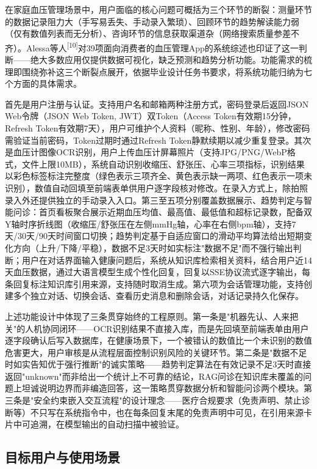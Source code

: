 \documentclass[zihao=-4,a4paper]{ctexart}
\begin{document}
在家庭血压管理场景中，用户面临的核心问题可概括为三个环节的断裂：测量环节的数据记录阻力大（手写易丢失、手动录入繁琐）、回顾环节的趋势解读能力弱（仅有数值列表而无分析）、咨询环节的信息获取渠道杂（网络搜索质量参差不齐）。Alessa等人\textsuperscript{[10]}对39项面向消费者的血压管理App的系统综述也印证了这一判断——绝大多数应用仅提供数据可视化，缺乏预测和趋势分析功能。功能需求的梳理即围绕弥补这三个断裂点展开，依据毕业设计任务书要求，将系统功能归纳为七个方面的具体需求。

首先是用户注册与认证。支持用户名和邮箱两种注册方式，密码登录后返回JSON Web令牌（JSON Web Token, JWT）双Token（Access Token有效期15分钟，Refresh Token有效期7天），用户可维护个人资料（昵称、性别、年龄），修改密码需验证当前密码，Token过期时通过Refresh Token静默续期以减少重复登录。其次是血压计图像OCR识别，用户上传血压计屏幕照片（支持JPG/PNG/WebP格式，文件上限10MB），系统自动识别收缩压、舒张压、心率三项指标，识别结果以彩色标签标注完整度（绿色表示三项齐全、黄色表示缺一两项、红色表示一项未识别），数值自动回填至前端表单供用户逐字段核对修改。在录入方式上，除拍照录入外还提供独立的手动录入入口。第三至五项分别覆盖数据展示、趋势判定与智能问诊：首页看板聚合展示近期血压均值、最高值、最低值和超标记录数，配备双Y轴时序折线图（收缩压/舒张压在左侧mmHg轴，心率在右侧bpm轴），支持7天/30天/90天时间窗口切换；趋势判定基于自适应窗口的滑动平均算法给出短期变化方向（上升/下降/平稳），数据不足3天时如实标注"数据不足"而不强行输出判断；用户在对话界面输入健康问题后，系统从知识库检索相关资料，结合用户近14天血压数据，通过大语言模型生成个性化回复，回复以SSE协议流式逐字输出，每条回复标注知识库引用来源，支持随时取消生成。第六项为会话管理功能，支持创建多个独立对话、切换会话、查看历史消息和删除会话，对话记录持久化保存。

上述功能设计中体现了三条贯穿始终的工程原则。第一条是"机器先认、人来把关"的人机协同闭环——OCR识别结果不直接入库，而是先回填至前端表单由用户逐字段确认后写入数据库，在健康场景下，一个被错认的数值比一个未识别的数值危害更大，用户审核是从流程层面控制识别风险的关键环节。第二条是"数据不足时如实告知优于强行推断"的诚实策略——趋势判定算法在有效记录不足3天时直接返回"unknown"而非给出一个统计上不可靠的结论，RAG问诊在知识库未覆盖的问题上坦诚说明边界而非编造回答，这一策略贯穿数据分析和智能问诊两个模块。第三条是"安全约束嵌入交互流程"的设计理念——医疗合规要求（免责声明、禁止诊断等）不只写在系统指令中，也在每条回复末尾的免责声明中可见，在引用来源卡片中可追溯，在模型输出的自动扫描中被验证。

\subsection{目标用户与使用场景}
\end{document}
